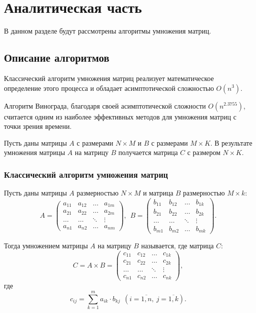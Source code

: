 \chapter{Аналитическая часть}

В данном разделе будут рассмотрены алгоритмы умножения матриц.

\section{Описание алгоритмов}

Классический алгоритм умножения матриц реализует математическое определение этого процесса и обладает асимптотической сложностью $O(n^{3})$.

Алгоритм Винограда, благодаря своей асимптотической сложности $O(n^{2.3755})$, считается одним из наиболее эффективных методов для умножения матриц с точки зрения времени.

Пусть даны матрицы $A$ с размерами $N\times M$ и  $B$ с размерами $M\times K$.
В результате умножения матрицы $A$ на матрицу $B$ получается матрица  $C$ с размером
$N\times K$.

\subsection{Классический алгоритм умножения матриц}

Пусть даны матрицы $A$ размерностью  $N \times M$ и матрица $B$ размерностью  $M \times k$:
\begin{equation}
    A = 
\begin{pmatrix}
    a_{11} & a_{12} & \ldots & a_{1m} \\
    a_{21} & a_{22} & \ldots & a_{2m} \\
    \hdots & \hdots & \ddots & \vdots \\
    a_{n1} & a_{n2} & \ldots & a_{nm}
\end{pmatrix}, \ \
    B = 
\begin{pmatrix}
    b_{11} & b_{12} & \ldots & b_{1k} \\
    b_{21} & b_{22} & \ldots & b_{2k} \\
    \hdots & \hdots & \ddots & \vdots \\
    b_{m1} & b_{m2} & \ldots & b_{mk}
\end{pmatrix}.
\end{equation}

\medskip

Тогда умножением матрицы $A$ на матрицу  $B$ называется, где матрица $C$:
\begin{equation}
    C = A\times B =
\begin{pmatrix}
    c_{11} & c_{12} & \ldots & c_{1k} \\
    c_{21} & c_{22} & \ldots & c_{2k} \\
    \hdots & \hdots & \ddots & \vdots \\
    c_{n1} & c_{n2} & \ldots & c_{nk}
\end{pmatrix},
\end{equation}
где
\begin{equation}
    c_{ij} = \sum\limits_{k=1}^{m} a_{ik} \cdot b_{kj} \ \ (i = \overline{1,n}, \
    j = \overline{1,k}).
\end{equation}


